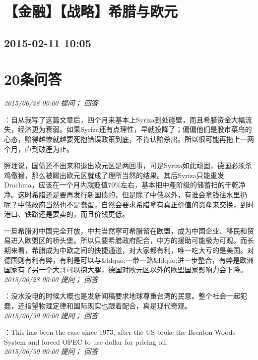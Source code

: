 \documentclass[twocolumn]{ctexart}
\begin{document}
\section{【金融】【战略】希腊与欧元 }
\subsection{2015-02-11 10:05}


\section{20条问答}

\textit{\hfill\noindent\small 2015/06/28 00:00 提问； 回答}

：自从我写了这篇文章后，四个月来基本上Syriza到处碰壁，而且希腊资金大幅流失，经济更为衰弱。如果Syriza还有点理性，早就投降了；偏偏他们是股市菜鸟的心态，赔得越惨就越要死抱错误政策到底，不肯认赔杀出。所以很可能再拖上一两个月，直到破產为止。

照理说，国债还不出来和退出欧元区是两回事，可是Syriza如此顽固，德国必须杀鸡儆猴，那么被踢出欧元区就成了理所当然的结果。其后Syriza只能重发Drachma，应该在一个月内就贬值70\%左右，基本把中產阶级的储蓄扫的干乾净净。这时希腊还是要再发行新国债的，但是除了中俄以外，有谁会拿钱往水里扔呢？中俄政府当然也不是蠢蛋，自然会要求希腊拿有真正价值的资產来交换，到时港口、铁路还是要卖的，而且价钱更低。

一旦希腊对中国完全开放，中共当然寧可希腊留在欧盟，成为中国企业、移民和贸易进入欧盟区的桥头堡。所以只要希腊政府配合，中方的援助可能极为可观。而长期来看，希腊成为中欧之间的快捷通道，对大家都有利，唯一吃大亏的是美国。对德国则有利有弊，有利是可以与\&ldquo;一带一路\&ldquo;进一步整合，有弊是欧洲国家有了另一个大哥可以抱大腿，德国对欧元区以外的欧盟国家影响力会下降。\\

\textit{\hfill\noindent\small 2015/06/28 00:00 提问； 回答}

：没水没电的时候大概也是发新闻稿要求地球尊重台湾的民意。整个社会一起犯蠢，还指望物理定律和国际现实也跟着配合，真是现代奇观。\\

\textit{\hfill\noindent\small 2015/06/30 00:00 提问； 回答}

：This has been the case since 1973, after the US broke the Brenton Woods System and forced OPEC to use dollar for pricing oil.\\

\textit{\hfill\noindent\small 2015/06/30 00:00 提问； 回答}
\end{document}
